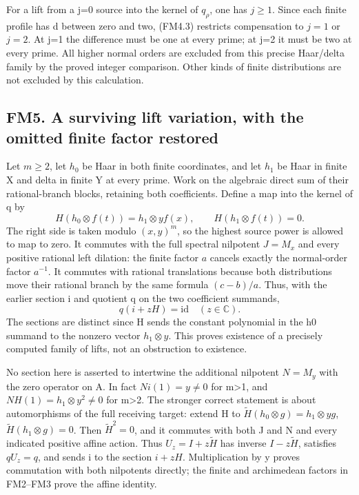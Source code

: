 For a lift from a j=0 source into the kernel of \(q_\rho\), one has
\(j\ge1\). Since each finite profile has d between zero and two, (FM4.3)
restricts compensation to \(j=1\) or \(j=2\). At j=1 the difference must
be one at every prime; at j=2 it must be two at every prime. All higher
normal orders are excluded from this precise Haar/delta family by the
proved integer comparison. Other kinds of finite distributions are not
excluded by this calculation.

\subsection{FM5. A surviving lift variation, with the omitted finite
factor
restored}\label{fm5.-a-surviving-lift-variation-with-the-omitted-finite-factor-restored}

Let \(m\ge2\), let \(h_0\) be Haar in both finite coordinates, and let
\(h_1\) be Haar in finite X and delta in finite Y at every prime. Work
on the algebraic direct sum of their rational-branch blocks, retaining
both coefficients. Define a map into the kernel of q by \[
H(h_0\otimes f(t))=h_1\otimes y f(x),\qquad
H(h_1\otimes f(t))=0.
\tag{FM5.1}
\] The right side is taken modulo \((x,y)^m\), so the highest source
power is allowed to map to zero. It commutes with the full spectral
nilpotent \(J=M_x\) and every positive rational left dilation: the
finite factor \(a\) cancels exactly the normal-order factor \(a^{-1}\).
It commutes with rational translations because both distributions move
their rational branch by the same formula \((c-b)/a\). Thus, with the
earlier section i and quotient q on the two coefficient summands, \[
q(i+zH)=\mathrm{id}\quad(z\in\mathbb C).
\tag{FM5.2}
\] The sections are distinct since H sends the constant polynomial in
the h0 summand to the nonzero vector \(h_1\otimes y\). This proves
existence of a precisely computed family of lifts, not an obstruction to
existence.

No section here is asserted to intertwine the additional nilpotent
\(N=M_y\) with the zero operator on A. In fact \(Ni(1)=y\ne0\) for
m\textgreater1, and \(NH(1)=h_1\otimes y^2\ne0\) for m\textgreater2. The
stronger correct statement is about automorphisms of the full receiving
target: extend H to \(\widetilde H(h_0\otimes g)=h_1\otimes yg\),
\(\widetilde H(h_1\otimes g)=0\). Then \(\widetilde H^2=0\), and it
commutes with both J and N and every indicated positive affine action.
Thus \(U_z=I+z\widetilde H\) has inverse \(I-z\widetilde H\), satisfies
\(qU_z=q\), and sends i to the section \(i+zH\). Multiplication by y
proves commutation with both nilpotents directly; the finite and
archimedean factors in FM2--FM3 prove the affine identity.

